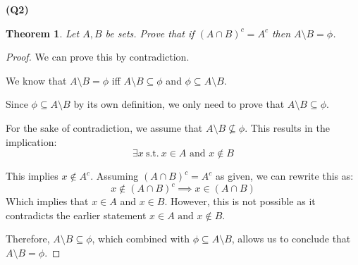 \documentclass[12pt, a4paper]{article}
\newtheorem{theorem}{Theorem}
\begin{document}
\textbf{(Q2)}
\begin{theorem}
    Let $A,B$ be sets. Prove that if $(A \cap B)^{c} = A^{c}$ then $A \setminus B = \phi$.
\end{theorem}

\begin{proof}
    We can prove this by contradiction.

    We know that $A \setminus B = \phi$ iff $A \setminus B \subseteq \phi$ and $\phi \subseteq A \setminus B$. 
    
    Since $\phi \subseteq A \setminus B$ by its own definition, we only need
    to prove that $A \setminus B \subseteq \phi$.

    For the sake of contradiction, we assume that $A \setminus B \nsubseteq \phi$. 
    This results in the implication:
    \begin{equation}
        \exists x \:\text{s.t.}\: x \in A \text{ and } x \notin B
    \end{equation}

    This implies $x \notin A^{c}$. Assuming $(A \cap B)^{c} = A^{c}$ as given, we can rewrite this as:
    \[
        x \notin \left(A \cap B\right)^{c} \implies x \in \left(A \cap B\right)
    \]
    Which implies that $x \in A$ and $x \in B$. However, this is not possible as it contradicts
    the earlier statement $x \in A \text{ and } x \notin B$.

    Therefore, $A \setminus B \subseteq \phi$, which combined with $\phi \subseteq A \setminus B$,
    allows us to conclude that $A \setminus B = \phi$.

\end{proof}
\end{document}
